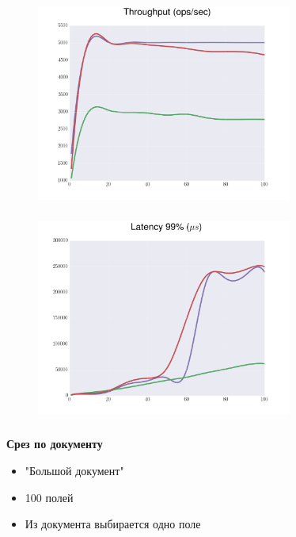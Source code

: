 \documentclass[18pt, compress, aspectratio=169]{beamer}
\begin{document}
\begin{frame}
    \frametitle{}
    \begin{center}
    \begin{figure}
        \includegraphics[width=0.75\textwidth,center]{benchmarks/workload_c_complex_object/throughput.png}
    \end{figure}
    \end{center}
\end{frame}

\begin{frame}
    \frametitle{}
    \begin{center}
    \begin{figure}
        \includegraphics[width=0.75\textwidth,center]{benchmarks/workload_c_complex_object/latency_99.png}
    \end{figure}
    \end{center}
\end{frame}

\begin{frame}
    \frametitle{}
    \begin{center}
        \textbf{Срез по документу}
        \begin{itemize}[label={}]
            \item "Большой документ"
            \item 100 полей
            \item Из документа выбирается одно поле
        \end{itemize}
    \end{center}
\end{frame}
\end{document}
